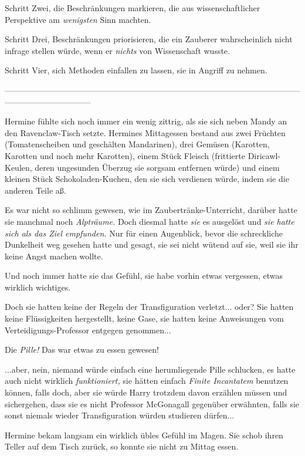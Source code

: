 {Schritt Zwei, die Beschränkungen markieren, die aus wissenschaftlicher Perspektive am \emph{wenigsten} Sinn machten.

Schritt Drei, Beschränkungen priorisieren, die ein Zauberer wahrscheinlich nicht infrage stellen würde, wenn er \emph{nichts} von Wissenschaft wusste.

Schritt Vier, sich Methoden einfallen zu lassen, sie in Angriff zu nehmen.

--------------------------------------------------------------------------------------------------------------------------------------------

\hfill\break Hermine fühlte sich noch immer ein wenig zittrig, als sie sich neben Mandy an den Ravenclaw-Tisch setzte. Hermines Mittagessen bestand aus zwei Früchten (Tomatenscheiben und geschälten Mandarinen), drei Gemüsen (Karotten, Karotten und noch mehr Karotten), einem Stück Fleisch (frittierte Diricawl-Keulen, deren ungesunden Überzug sie sorgsam entfernen würde) und einem kleinen Stück Schokoladen-Kuchen, den sie sich verdienen würde, indem sie die anderen Teile aß.

Es war nicht so schlimm gewesen, wie im Zaubertränke-Unterricht, darüber hatte sie manchmal noch \emph{Alpträume.} Doch diesmal hatte \emph{sie} es ausgelöst und \emph{sie hatte sich als das Ziel empfunden.} Nur für einen Augenblick, bevor die schreckliche Dunkelheit weg gesehen hatte und gesagt, sie sei nicht wütend auf sie, weil sie ihr keine Angst machen wollte.

Und noch immer hatte sie das Gefühl, sie habe vorhin etwas vergessen, etwas wirklich wichtiges.

Doch sie hatten keine der Regeln der Transfiguration verletzt... oder? Sie hatten keine Flüssigkeiten hergestellt, keine Gase, sie hatten keine Anweisungen vom Verteidigungs-Professor entgegen genommen...

Die \emph{Pille!} Das war etwas zu essen gewesen!

...aber, nein, niemand würde einfach eine herumliegende Pille schlucken, es hatte auch nicht wirklich \emph{funktioniert,} sie hätten einfach \emph{Finite Incantatem} benutzen können, falls doch, aber sie würde Harry trotzdem davon erzählen müssen und sichergehen, dass sie es nicht Professor McGonagall gegenüber erwähnten, falls sie sonst niemals wieder Transfiguration würden studieren dürfen...

Hermine bekam langsam ein wirklich übles Gefühl im Magen. Sie schob ihren Teller auf dem Tisch zurück, so konnte sie nicht zu Mittag essen.

}
